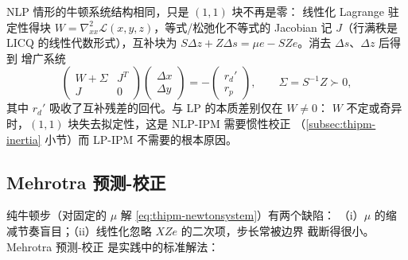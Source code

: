 \begin{remark}\label{rem:thipm-nlp-newton}
NLP 情形的牛顿系统结构相同，只是 $(1,1)$ 块不再是零：
线性化 Lagrange 驻定性得块
$W=\nabla_{xx}^{2}\mathcal{L}(x,y,z)$，等式/松弛化不等式的 Jacobian 记
$J$（行满秩是 LICQ 的线性代数形式），互补块为
$S\Delta z+Z\Delta s=\mu e-SZe$。消去 $\Delta s$、$\Delta z$ 后得到
增广系统
\begin{equation}\label{eq:thipm-augmented-nlp}
  \begin{pmatrix}
    W+\Sigma & J^{T}\\
    J & 0
  \end{pmatrix}
  \begin{pmatrix}\Delta x\\ \Delta y\end{pmatrix}
  =
  -\begin{pmatrix} r_d'\\ r_p\end{pmatrix},
  \qquad \Sigma=S^{-1}Z\succ0,
\end{equation}
其中 $r_d'$ 吸收了互补残差的回代。与 LP 的本质差别仅在 $W\ne0$：
$W$ 不定或奇异时，$(1,1)$ 块失去拟定性，这是 NLP-IPM 需要惯性校正
（\ref{subsec:thipm-inertia} 小节）而 LP-IPM 不需要的根本原因。
\end{remark}

\subsection{Mehrotra 预测-校正}\label{subsec:thipm-mehrotra}

纯牛顿步（对固定的 $\mu$ 解 \eqref{eq:thipm-newtonsystem}）有两个缺陷：
（i）$\mu$ 的缩减节奏盲目；（ii）线性化忽略 $XZe$ 的二次项，步长常被边界
截断得很小。Mehrotra 预测-校正 \cite{ipmmehrotra1992} 是实践中的标准解法：

